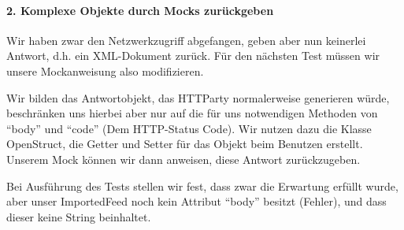 \paragraph{2. Komplexe Objekte durch Mocks zurückgeben}

Wir haben zwar den Netzwerkzugriff abgefangen, geben aber nun keinerlei Antwort, d.h. ein XML-Dokument zurück. Für den nächsten Test müssen wir unsere Mockanweisung also modifizieren.

\begin{ruby}[label=test/test\_imported\_feed.rb]
  
      
        
      


      
      
\end{ruby}

Wir bilden das Antwortobjekt, das HTTParty normalerweise generieren würde, beschränken uns hierbei aber nur auf die für uns notwendigen Methoden von "`body"' und "`code"' (Dem HTTP-Status Code). Wir nutzen dazu die Klasse OpenStruct, die Getter und Setter für das Objekt beim Benutzen erstellt. Unserem Mock können wir dann anweisen, diese Antwort zurückzugeben.
\tddred

Bei Ausführung des Tests stellen wir fest, dass zwar die Erwartung erfüllt wurde, aber unser ImportedFeed noch kein Attribut "`body"' besitzt (Fehler), und dass dieser keine String beinhaltet.

\begin{ruby}[label=app/models/job.rb]
 
   
   
      
      
\end{ruby}


